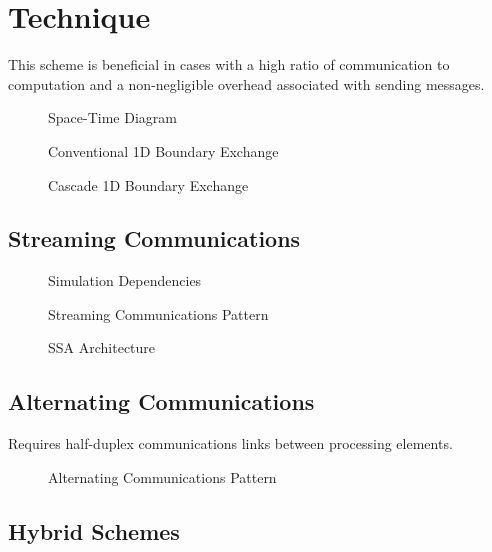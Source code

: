 \section{Technique}


This scheme is beneficial in cases with a high ratio of communication to computation and a non-negligible overhead associated with sending messages.


\begin{figure}
  \centering
  
  \caption{Space-Time Diagram}
  \label{fig:lightcone}
\end{figure}


\begin{figure}
  \centering
  
  \caption{Conventional 1D Boundary Exchange}
  \label{fig:exch1d}
\end{figure}

\begin{figure}
  \centering
  
  \caption{Cascade 1D Boundary Exchange}
  \label{fig:casc1d}
\end{figure}

\subsection{Streaming Communications}
\begin{figure}
  \centering
  
  \caption{Simulation Dependencies}
  \label{fig:simcone}
\end{figure}

\begin{figure}
  \centering
  
  \caption{Streaming Communications Pattern}
  \label{fig:streamingcomms}
\end{figure}

\begin{figure}
  \centering
  
  \caption{SSA Architecture}
  \label{fig:ssa_concept}
\end{figure}



\subsection{Alternating Communications}

Requires half-duplex communications links between processing elements.
\begin{figure}
  \centering
  
  \caption{Alternating Communications Pattern}
  \label{fig:alternatingcomms}
\end{figure}


\subsection{Hybrid Schemes}

